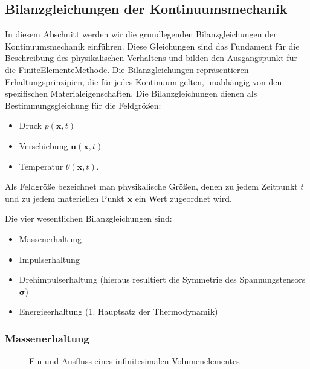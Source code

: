 \documentclass[letterpaper,10pt,german]{jupyterBook}
\let\sphinxpxdimen\pdfpxdimen\else\newdimen\sphinxpxdimen
\begin{document}
\subsection{Bilanzgleichungen der Kontinuumsmechanik}
\label{\detokenize{chapters/chapter1/elasticity:bilanzgleichungen-der-kontinuumsmechanik}}
\sphinxAtStartPar
In diesem Abschnitt werden wir die grundlegenden Bilanzgleichungen der Kontinuumsmechanik einführen. Diese Gleichungen sind das Fundament für die Beschreibung des physikalischen Verhaltens und bilden den Ausgangspunkt für die Finite\sphinxhyphen{}Elemente\sphinxhyphen{}Methode. Die Bilanzgleichungen repräsentieren Erhaltungsprinzipien, die für jedes Kontinuum gelten, unabhängig von den spezifischen Materialeigenschaften. Die Bilanzgleichungen dienen als Bestimmungsgleichung für die Feldgrößen:
\begin{itemize}
\item {} 
\sphinxAtStartPar
Druck \(p(\bm{x},t)\)

\item {} 
\sphinxAtStartPar
Verschiebung \(\bm{u}(\bm{x},t)\)

\item {} 
\sphinxAtStartPar
Temperatur \(\theta(\bm{x},t)\).

\end{itemize}

\sphinxAtStartPar
Als Feldgröße bezeichnet man physikalische Größen, denen zu jedem Zeitpunkt \(t\) und zu jedem materiellen Punkt \(\bm{x}\) ein Wert zugeordnet wird.

\sphinxAtStartPar
Die vier wesentlichen Bilanzgleichungen sind:
\begin{itemize}
\item {} 
\sphinxAtStartPar
Massenerhaltung

\item {} 
\sphinxAtStartPar
Impulserhaltung

\item {} 
\sphinxAtStartPar
Drehimpulserhaltung (hieraus resultiert die Symmetrie des Spannungstensors \(\bm{\sigma}\))

\item {} 
\sphinxAtStartPar
Energieerhaltung (1. Hauptsatz der Thermodynamik)

\end{itemize}


\subsubsection{Massenerhaltung}
\label{\detokenize{chapters/chapter1/elasticity:massenerhaltung}}
\begin{figure}[htbp]
\centering
\capstart

\noindent\sphinxincludegraphics[height=200\sphinxpxdimen]{{Massenbilanz}.jpg}
\caption{Ein\sphinxhyphen{} und Ausfluss eines infinitesimalen Volumenelementes }\label{\detokenize{chapters/chapter1/elasticity:massenbilanz}}\end{figure}
\end{document}
